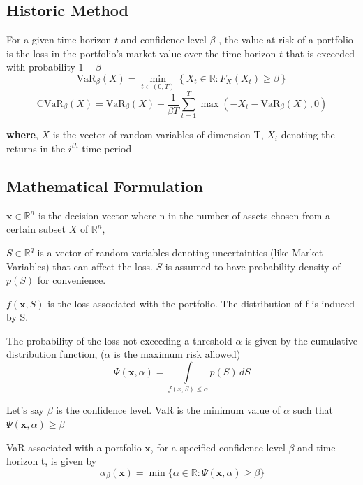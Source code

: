 \documentclass[conference]{IEEEtran}
\begin{document}
    
    
\subsection{Historic Method}
    For a given time horizon $t$ and confidence level $\beta$ , the value at risk of a portfolio is the loss in the portfolio's market value over the time horizon $t$ that is exceeded with probability $1 - \beta$
    \[ 
        \text{VaR}_{\beta}(X) = \min_{t \in (0,T)} \left \{ X_{t} \in \mathbb{R}: F_{X}(X_{t}) \geq \beta \right \}
    \]
    \[
        \text{CVaR}_{\beta}(X) = \text{VaR}_{\beta}(X) +
        \frac{1}{\beta T} \sum_{t=1}^{T} \max(-X_{t} -
        \text{VaR}_{\beta}(X), 0)
    \]
    
\textbf{where}, $X$ is the vector of random variables of dimension T, $X_i$ denoting the returns in the $i^{th}$ time period

\subsection{Mathematical Formulation}
    
    $\textbf{x} \in \mathbb{R}^n$ is the decision vector where n in the number of assets chosen from a certain subset $X$ of $\mathbb{R}^n$,
    
    $S \in \mathbb{R}^q$ is a vector of random variables denoting uncertainties (like Market Variables) that can affect the loss. 
    $S$ is assumed to have probability density of $p(S)$ for convenience.
    
    $f(\textbf{x}, S)$ is the loss associated with the portfolio. The distribution of f is induced by S.
    
    The probability of the loss not exceeding a threshold $\alpha$ is given by the cumulative distribution function, ($\alpha$ is the maximum risk allowed)
    \begin{equation}
        \Psi(\textbf{x}, \alpha) = 
        \underset{f(x, S) \leq \alpha}{\int}
        p(S) \, dS
    \end{equation}
    
    Let's say $\beta$ is the confidence level. VaR is the minimum value of $\alpha$ such that 
    $ \Psi(\textbf{x}, \alpha) \geq \beta $
    
    VaR associated with a portfolio $\mathbf{x}$, for a specified confidence level $\beta$ and time horizon t, is given by
    \begin{equation}
        \alpha_\beta(\textbf{x}) =
        \min \{ 
        \alpha \in \mathbb{R}: 
        \Psi(\textbf{x}, \alpha) \geq \beta
        \}
    \end{equation}
    
\end{document}
